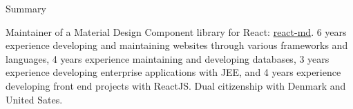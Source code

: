\documentclass{resume} %
\begin{document}

\begin{rSection}{Summary}

Maintainer of a Material Design Component library for React: \href{https://github.com/mlaursen/react-md}{react-md}. 6 years experience developing and maintaining websites through various frameworks and languages, 4 years experience maintaining and developing databases, 3 years experience developing enterprise applications with JEE, and 4 years experience developing front end projects with ReactJS. Dual citizenship with Denmark and United Sates.

\end{rSection}


\end{document}
